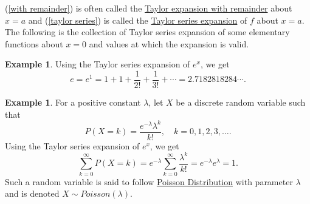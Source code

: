 \documentclass[12pt,letterpaper]{book}
\numberwithin{equation}{section}
\theoremstyle{definition}
\newtheorem{example}[thm]{\textbf{Example}}
\begin{document}
(\ref{with remainder}) is often called the \underline{Taylor expansion with remainder} about $x=a$ and (\ref{taylor series}) is called the \underline{Taylor series expansion} of $f$ about $x=a$. \\

The following is the collection of Taylor series expansion of some elementary functions about $x=0$ and values at which the expansion is valid.\medskip

\begin{center}
\end{center}
\medskip
\begin{example}
Using the Taylor series expansion of $e^x$, we get
$$e=e^1=1+1+\frac{1}{2!}+\frac{1}{3!}+\cdots=2.7182818284\cdots.$$
\end{example}

\begin{example} For a positive constant $\lambda$, let $X$ be a discrete random variable such that
$$P(X=k)=\frac{e^{-\lambda}\lambda^k}{k!},\quad k=0,1,2,3,\ldots.$$
Using the Taylor series expansion of $e^x$, we get $$\sum_{k=0}^\infty P(X=k)=e^{-\lambda}\sum_{k=0}^\infty\frac{\lambda^k}{k!}=e^{-\lambda}e^\lambda=1.$$
Such a random variable is said to follow \underline{Poisson Distribution} with parameter $\lambda$ and is denoted $X\sim Poisson(\lambda)$.
\end{example}
\end{document}
